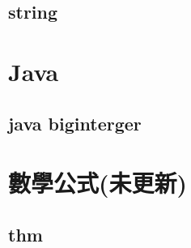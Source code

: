     \subsection{string}
        

\section{Java}
    \subsection{java biginterger}
        


\section{數學公式(未更新)}
    \subsection{thm}
        
        
